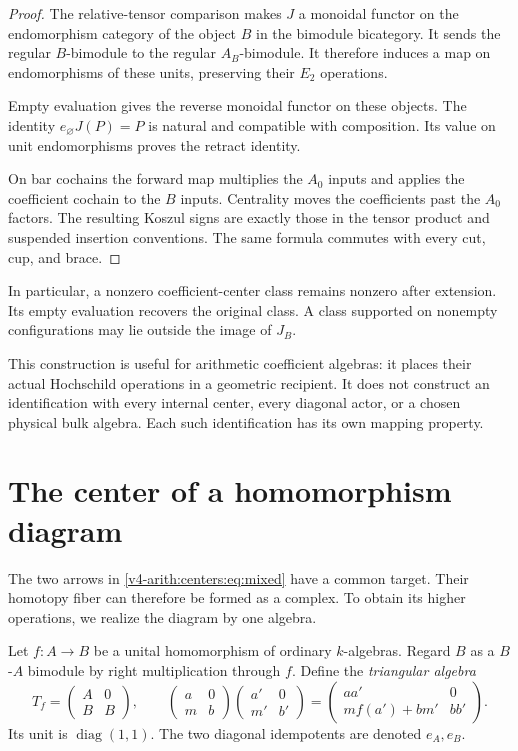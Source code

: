 \begin{proof}
The relative-tensor comparison makes $J$ a monoidal
functor on the endomorphism category of the object
$B$ in the bimodule bicategory. It sends the regular
$B$-bimodule to the regular $A_B$-bimodule.
It therefore induces a map on endomorphisms of these
units, preserving their $E_2$ operations.

Empty evaluation gives the reverse monoidal functor
on these objects. The identity $e_\varnothing J(P)=P$
is natural and compatible with composition.
Its value on unit endomorphisms proves the retract
identity.

On bar cochains the forward map multiplies the
$A_0$ inputs and applies the coefficient cochain to
the $B$ inputs. Centrality moves the coefficients
past the $A_0$ factors. The resulting Koszul signs
are exactly those in the tensor product and
suspended insertion conventions. The same formula
commutes with every cut, cup, and brace.
\end{proof}

In particular, a nonzero coefficient-center class
remains nonzero after extension. Its empty
evaluation recovers the original class. A class
supported on nonempty configurations may lie
outside the image of $J_B$.

This construction is useful for arithmetic
coefficient algebras: it places their actual
Hochschild operations in a geometric recipient.
It does not construct an identification with every
internal center, every diagonal actor, or a chosen
physical bulk algebra. Each such identification
has its own mapping property.

\section{The center of a homomorphism diagram}
\label{v4-arith:centers:sec:triangle}

The two arrows in
\eqref{v4-arith:centers:eq:mixed} have a common target.
Their homotopy fiber can therefore be formed as a
complex. To obtain its higher operations, we realize
the diagram by one algebra.

Let $f:A\to B$ be a unital homomorphism of ordinary
$k$-algebras. Regard $B$ as a $B$-$A$ bimodule by
right multiplication through $f$. Define the
\emph{triangular algebra}
\begin{equation}\label{v4-arith:centers:eq:triangle}
 T_f=
 \begin{pmatrix}A&0\\ B&B\end{pmatrix},
 \qquad
 \begin{pmatrix}a&0\\ m&b\end{pmatrix}
 \begin{pmatrix}a'&0\\ m'&b'\end{pmatrix}
 =
 \begin{pmatrix}
 aa'&0\\ mf(a')+bm'&bb'
 \end{pmatrix}.
\end{equation}
Its unit is $\operatorname{diag}(1,1)$.
The two diagonal idempotents are denoted $e_A,e_B$.

